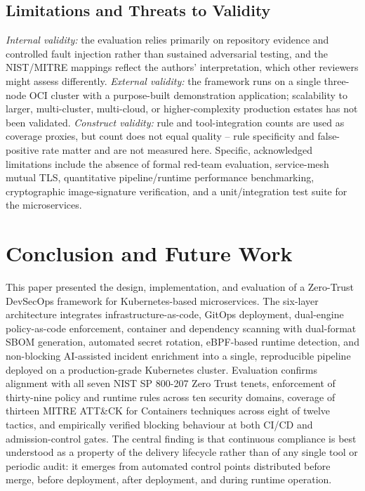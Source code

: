 \documentclass[conference]{IEEEtran}
\begin{document}
\subsection{Limitations and Threats to Validity}
\emph{Internal validity:} the evaluation relies primarily on repository evidence and controlled fault injection rather than sustained adversarial testing, and the NIST/MITRE mappings reflect the authors' interpretation, which other reviewers might assess differently. \emph{External validity:} the framework runs on a single three-node OCI cluster with a purpose-built demonstration application; scalability to larger, multi-cluster, multi-cloud, or higher-complexity production estates has not been validated. \emph{Construct validity:} rule and tool-integration counts are used as coverage proxies, but count does not equal quality -- rule specificity and false-positive rate matter and are not measured here. Specific, acknowledged limitations include the absence of formal red-team evaluation, service-mesh mutual TLS, quantitative pipeline/runtime performance benchmarking, cryptographic image-signature verification, and a unit/integration test suite for the microservices.

\section{Conclusion and Future Work}

This paper presented the design, implementation, and evaluation of a Zero-Trust DevSecOps framework for Kubernetes-based microservices. The six-layer architecture integrates infrastructure-as-code, GitOps deployment, dual-engine policy-as-code enforcement, container and dependency scanning with dual-format SBOM generation, automated secret rotation, eBPF-based runtime detection, and non-blocking AI-assisted incident enrichment into a single, reproducible pipeline deployed on a production-grade Kubernetes cluster. Evaluation confirms alignment with all seven NIST SP 800-207 Zero Trust tenets, enforcement of thirty-nine policy and runtime rules across ten security domains, coverage of thirteen MITRE ATT\&CK for Containers techniques across eight of twelve tactics, and empirically verified blocking behaviour at both CI/CD and admission-control gates. The central finding is that continuous compliance is best understood as a property of the delivery lifecycle rather than of any single tool or periodic audit: it emerges from automated control points distributed before merge, before deployment, after deployment, and during runtime operation.
\end{document}
